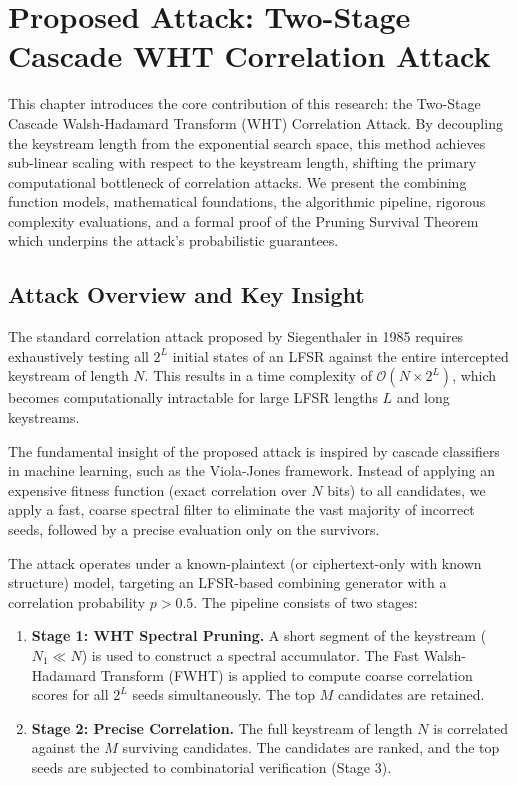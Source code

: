 \chapter{Proposed Attack: Two-Stage Cascade WHT Correlation Attack}
\label{ch:proposed_attack}

This chapter introduces the core contribution of this research: the Two-Stage Cascade Walsh-Hadamard Transform (WHT) Correlation Attack. By decoupling the keystream length from the exponential search space, this method achieves sub-linear scaling with respect to the keystream length, shifting the primary computational bottleneck of correlation attacks. We present the combining function models, mathematical foundations, the algorithmic pipeline, rigorous complexity evaluations, and a formal proof of the Pruning Survival Theorem which underpins the attack's probabilistic guarantees.

\section{Attack Overview and Key Insight}
\label{sec:attack_overview}

The standard correlation attack proposed by Siegenthaler in 1985 requires exhaustively testing all $2^L$ initial states of an LFSR against the entire intercepted keystream of length $N$. This results in a time complexity of $\mathcal{O}(N \times 2^L)$, which becomes computationally intractable for large LFSR lengths $L$ and long keystreams. 

The fundamental insight of the proposed attack is inspired by cascade classifiers in machine learning, such as the Viola-Jones framework. Instead of applying an expensive fitness function (exact correlation over $N$ bits) to all candidates, we apply a fast, coarse spectral filter to eliminate the vast majority of incorrect seeds, followed by a precise evaluation only on the survivors. 

The attack operates under a known-plaintext (or ciphertext-only with known structure) model, targeting an LFSR-based combining generator with a correlation probability $p > 0.5$. The pipeline consists of two stages:
\begin{enumerate}
    \item \textbf{Stage 1: WHT Spectral Pruning.} A short segment of the keystream ($N_1 \ll N$) is used to construct a spectral accumulator. The Fast Walsh-Hadamard Transform (FWHT) is applied to compute coarse correlation scores for all $2^L$ seeds simultaneously. The top $M$ candidates are retained.
    \item \textbf{Stage 2: Precise Correlation.} The full keystream of length $N$ is correlated against the $M$ surviving candidates. The candidates are ranked, and the top seeds are subjected to combinatorial verification (Stage 3).
\end{enumerate}

